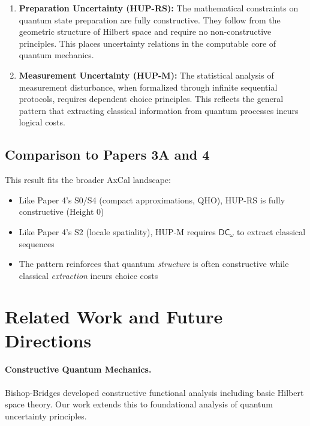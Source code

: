 \documentclass[11pt]{article}
\newcommand{\DCw}{\mathsf{DC}_{\omega}}
\theoremstyle{plain}
\theoremstyle{definition}
\theoremstyle{remark}
\begin{document}
\begin{enumerate}
\item \textbf{Preparation Uncertainty (HUP-RS):} The mathematical constraints on quantum state preparation are fully constructive. They follow from the geometric structure of Hilbert space and require no non-constructive principles. This places uncertainty relations in the computable core of quantum mechanics.

\item \textbf{Measurement Uncertainty (HUP-M):} The statistical analysis of measurement disturbance, when formalized through infinite sequential protocols, requires dependent choice principles. This reflects the general pattern that extracting classical information from quantum processes incurs logical costs.
\end{enumerate}

\subsection{Comparison to Papers 3A and 4}

This result fits the broader AxCal landscape:
\begin{itemize}
\item Like Paper 4's S0/S4 (compact approximations, QHO), HUP-RS is fully constructive (Height 0)
\item Like Paper 4's S2 (locale spatiality), HUP-M requires $\DCw$ to extract classical sequences
\item The pattern reinforces that quantum \emph{structure} is often constructive while classical \emph{extraction} incurs choice costs
\end{itemize}

\section{Related Work and Future Directions}

\paragraph{Constructive Quantum Mechanics.}
Bishop-Bridges \cite{BishopBridges} developed constructive functional analysis including basic Hilbert space theory. Our work extends this to foundational analysis of quantum uncertainty principles.
\end{document}
